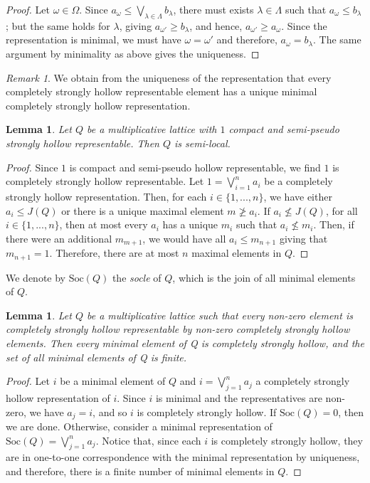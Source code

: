 \documentclass[11pt,english]{amsart}
\newtheorem{lemma}[theorem]{Lemma}
\theoremstyle{definition}
\numberwithin{equation}{section}
\theoremstyle{remark}
\newtheorem{remark}[theorem]{Remark}
\def\leq{\leqslant}
\begin{document}
	\begin{proof}
		Let $\omega\in\Omega$. Since $a_\omega\leq\bigvee_{\lambda\in\Lambda}b_{\lambda}$, there must exists $\lambda\in\Lambda$ such that $a_{\omega}\leq b_\lambda$; but the same  holds for $\lambda$, giving $a_{\omega '}\geqslant b_\lambda$, and hence, $a_{\omega '}\geqslant a_\omega$. Since the representation is minimal, we must have $\omega=\omega'$ and therefore, $a_\omega=b_\lambda$. The same argument by minimality as above gives the uniqueness.
	\end{proof}
	
	\begin{remark}
		We obtain from the uniqueness of the representation that every completely strongly hollow representable element has a unique minimal completely strongly hollow representation.
	\end{remark}
	
	\begin{lemma}\label{L4.5}
		Let $Q$ be a multiplicative lattice with $1$ compact and semi-pseudo strongly hollow representable. Then $Q$ is semi-local.
	\end{lemma}
	
	\begin{proof}
		Since $1$ is compact and semi-pseudo hollow representable, we find $1$ is completely strongly hollow representable. Let $1=\bigvee_{i=1}^na_i$ be a completely strongly hollow representation. Then, for each $i\in\{1,...,n\}$, we have  either $a_i\leq J(Q)$ or there is a unique maximal element $m\ngeq a_i$. If $a_i\nleq J(Q)$, for all $i\in\{1,...,n\}$, then at most every $a_i$ has a unique $m_i$ such that $a_i\nleq m_i$. Then, if there were an additional $m_{m+1}$, we would have  all $a_i\leq m_{n+1}$ giving that $m_{n+1}=1$. Therefore, there are at most $n$ maximal elements in $Q$.
	\end{proof}
	
	We denote by $\mathrm{Soc}(Q)$ the \emph{socle} of $Q$, which is the join of all minimal elements of $Q$.
	
	\begin{lemma}\label{L4.6}
		Let $Q$ be a multiplicative lattice such that every non-zero element is completely strongly hollow representable by non-zero completely strongly hollow elements. Then every minimal element of Q is completely strongly hollow, and the set of all minimal elements of Q is finite.
	\end{lemma}
	
	\begin{proof}
		Let $i$ be a minimal element of $Q$ and $i=\bigvee_{j=1}^na_j$ a completely strongly hollow representation of $i$. Since $i$ is minimal and the representatives are non-zero, we have  $a_j=i$, and so $i$ is completely strongly hollow. If $\mathrm{Soc}(Q)=0$, then we are done. Otherwise, consider a minimal representation of $\mathrm{Soc}(Q)=\bigvee_{j=1}^na_j$. Notice that, since each $i$ is completely strongly hollow,  they are in one-to-one correspondence with the minimal representation by uniqueness, and therefore, there is a finite number of minimal elements in $Q$.
	\end{proof}
	\smallskip
	
\end{document}
